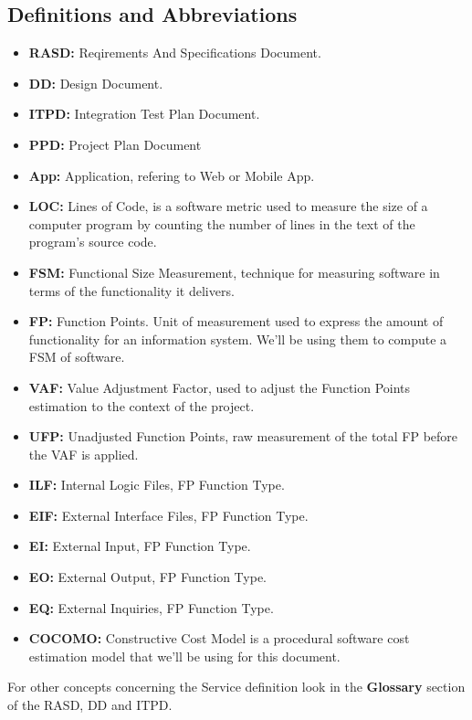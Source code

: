 \documentclass[a4paper]{article}
\begin{document}
\subsection{Definitions and Abbreviations}
\begin{itemize}
\item \textbf{RASD:} Reqirements And Specifications Document.
\item \textbf{DD:} Design Document.
\item \textbf{ITPD:} Integration Test Plan Document.
\item \textbf{PPD:} Project Plan Document
\item \textbf{App:} Application, refering to Web or Mobile App.
\item \textbf{LOC:} Lines of Code, is a software metric used to measure the size of a computer program by counting the number of lines in the text of the program's source code.
\item \textbf{FSM:} Functional Size Measurement, technique for measuring software in terms of the functionality it delivers.
\item \textbf{FP:} Function Points. Unit of measurement used to express the amount of functionality for an information system. We'll be using them to compute a FSM of software. 
\item \textbf{VAF:} Value Adjustment Factor, used to adjust the Function Points estimation to the context of the project.
\item \textbf{UFP:} Unadjusted Function Points, raw measurement of the total FP before the VAF is applied.
\item \textbf{ILF:} Internal Logic Files, FP Function Type.
\item \textbf{EIF:} External Interface Files, FP Function Type.
\item \textbf{EI:} External Input, FP Function Type.
\item \textbf{EO:} External Output, FP Function Type.
\item \textbf{EQ:} External Inquiries, FP Function Type.
\item \textbf{COCOMO:} Constructive Cost Model is a procedural software cost estimation model that we'll be using for this document.
\end{itemize}
For other concepts concerning the Service definition look in the \textbf{Glossary} section of the RASD, DD and ITPD.
\end{document}
